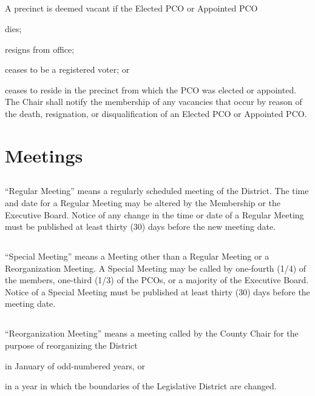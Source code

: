 \subsection{}
A precinct is deemed vacant if the Elected PCO or Appointed PCO
\begin{inlinealphalist}
    \item dies;
    \item resigns from office;
    \item ceases to be a registered voter; or
    \item ceases to reside in the precinct from which the PCO was elected or appointed. The Chair shall notify the membership of any vacancies that occur by reason of the death, resignation, or disqualification of an Elected PCO or Appointed PCO.
\end{inlinealphalist}

\section{Meetings}
\subsection{} \label{regular-meeting}
“Regular Meeting” means a regularly scheduled meeting of the \fortythird{} District. The time and date for a Regular Meeting may be altered by the Membership or the Executive Board. Notice of any change in the time or date of a Regular Meeting must be published at least thirty (30) days before the new meeting date.

\subsection{} \label{special-meeting}
“Special Meeting” means a Meeting other than a Regular Meeting or a Reorganization Meeting. A Special Meeting may be called by one-fourth (1/4) of the members, one-third (1/3) of the PCOs, or a majority of the Executive Board. Notice of a Special Meeting must be published at least thirty (30) days before the meeting date.

\subsection{} \label{reorg-meeting}
“Reorganization Meeting” means a meeting called by the County Chair for the purpose of reorganizing the \fortythird{} District
\begin{inlinealphalist}
    \item in January of odd-numbered years, or
    \item in a year in which the boundaries of the Legislative District are changed.
\end{inlinealphalist}

